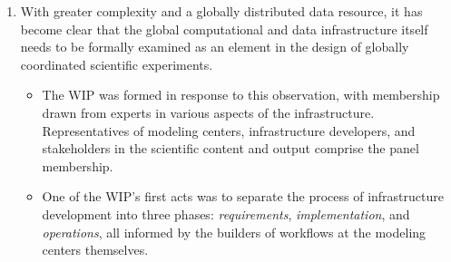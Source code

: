 \documentclass[gmd,manuscript]{copernicus}
\begin{document}
\begin{enumerate}
\item With greater complexity and a globally distributed data
  resource, it has become clear that the global computational and data
  infrastructure itself needs to be formally examined as an element in
  the design of globally coordinated scientific experiments.

  \begin{itemize}
  \item The WIP was formed in response to this observation, with
    membership drawn from experts in various aspects of the
    infrastructure. Representatives of modeling centers,
    infrastructure developers, and stakeholders in the scientific
    content and output comprise the panel membership.
  \item One of the WIP's first acts was to separate the process of
    infrastructure development into three phases: \emph{requirements},
    \emph{implementation}, and \emph{operations}, all informed by the
    builders of workflows at the modeling centers themselves.
    

\end{itemize}
\end{enumerate}
\end{document}
